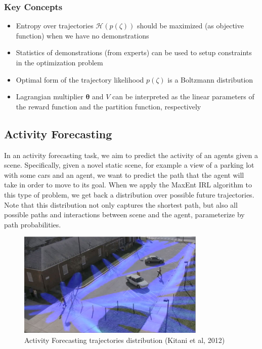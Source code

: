 \documentclass[11pt]{article}
\begin{document}
\subsubsection{Key Concepts}
\begin{itemize}
\item Entropy over trajectories $\mathcal{H}(p(\zeta))$ should be maximized (as objective function) when we have no demonstrations
\item Statistics of demonstrations (from experts) can be used to setup constraints in the optimization problem
\item Optimal form of the trajectory likelihood $p(\zeta)$ is a Boltzmann distribution
\item Lagrangian multiplier $\boldsymbol\theta$ and $V$ can be interpreted as the linear parameters of the reward function and the partition function, respectively
\end{itemize}


\subsection{Activity Forecasting}
In an activity forecasting task, we aim to predict the activity of an agents given a scene. Specifically, given a novel static scene, for example a view of a parking lot with some cars and an agent, we want to predict the path that the agent will take in order to move to its goal.  When we apply the MaxEnt IRL algorithm to this type of problem, we get back a distribution over possible future trajectories. Note that this distribution not only captures the shortest path, but also all possible paths and interactions between scene and the agent, parameterize by path probabilities.
\begin{figure}[h]
\centering
\includegraphics[width=0.8\textwidth]{pic-s3/act-forecast.JPG}
\caption{Activity Forecasting trajectories distribution (Kitani et al, 2012)}
\end{figure}
\end{document}
